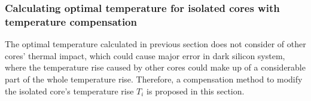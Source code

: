 







\subsubsection{Calculating optimal temperature for isolated cores with temperature compensation}
The optimal temperature calculated in previous section does not consider of other cores' thermal impact, which could cause major error in dark silicon system, where the temperature rise caused by other cores could make up of a considerable part of the whole temperature rise. Therefore, a compensation method to modify the isolated core's temperature rise $T_{i}$ is proposed in this section.

